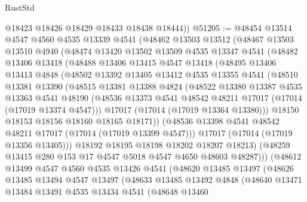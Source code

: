 \begin{lexlean}{RustStd}
\begin{coremodule}
        @18423
        @18426
        @18429
        @18433
        @18438
        @18444))
@51205 := @48454
    @13514
    @4547
    @4560
    @4535
    @13339
    @4541
    (@48462
      @13503
      @13512
      (@48467
        @13503
        @13510
        @4940
        (@48474
          @13420
          @13502
          @13509
          @4535
          @13347
          @4541
          (@48482
            @13406
            @13418
            (@48488
              @13406
              @13415
              @4547
              @13418
              (@48495
                @13406
                @13413
                @4848
                (@48502
                  @13392
                  @13405
                  @13412
                  @4535
                  @13355
                  @4541
                  (@48510
                    @13381
                    @13390
                    (@48515
                      @13381
                      @13388
                      @4824
                      (@48522
                        @13380
                        @13387
                        @4535
                        @13363
                        @4541
                        @48190
                        (@48536 @13373 @4541 @48542 @48211 @17017 (@17014 (@17019 @13374 @4547)))
                        @17017
                        (@17014 (@17019 @13364 @13380)))
                      @18150
                      @18153
                      @18156
                      @18160
                      @18165
                      @18171))
                  (@48536 @13398 @4541 @48542 @48211 @17017 (@17014 (@17019 @13399 @4547)))
                  @17017
                  (@17014 (@17019 @13356 @13405)))
                @18192
                @18195
                @18198
                @18202
                @18207
                @18213)
              (@48259 @13415 @280 @153 @17 @4547 @5018 @4547 @4650 @48603 @48287)))
          (@48612
            @13499
            @4547
            @4560
            @4535
            @13426
            @4541
            (@48620
              @13485
              @13497
              (@48626
                @13485
                @13494
                @4547
                @13497
                (@48633
                  @13485
                  @13492
                  @4848
                  (@48640
                    @13471
                    @13484
                    @13491
                    @4535
                    @13434
                    @4541
                    (@48648
                      @13460

\end{coremodule}
\end{lexlean}
